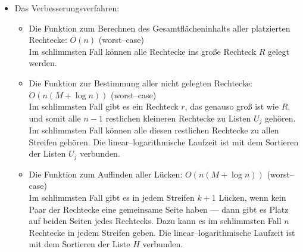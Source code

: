 \begin{itemize}
\begin{itemize}
		\item Das Finden der genauen Stelle in den Listen $S_j$: $O(M \log n)$ (worst--case)\\
		Nicht in jedem Streifen müssen sich dieselben Rechtecke befinden und ein Rechteck 
		kann zu mehreren Steifen gehören.
		In jedem Streifen muss man die genaue Position zum Platzieren des Rechtecks finden.
		Das erfolgt mittels der eingebauten Funktion , die in $O(\log n)$ läuft.\footnote{\href{https://en.cppreference.com/w/cpp/algorithm/upper_bound}{https://en.cppreference.com/w/cpp/algorithm/upper\_bound}}.
		Die Einfügen--Operation in eine  erfolgt in $O(1)$.\footnote{\href{https://en.cppreference.com/w/cpp/container/list/insert}{https://en.cppreference.com/w/cpp/container/list/insert}}
		Im schlimmsten Fall gehört ein Rechteck zu allen Streifen, deshalb muss die endliche Laufzeit
		mal $M$ multipliziert werden.
	\end{itemize}

	\item Das Verbesserungsverfahren: 

	\begin{itemize}
		\item Die Funktion zum Berechnen des Gesamtflächeninhalts aller platzierten Rechtecke: $O(n)$ (worst--case)\\
		Im schlimmsten Fall können alle Rechtecke ins große Rechteck $R$ gelegt werden.

		\item Die Funktion zur Bestimmung aller nicht gelegten Rechtecke: $O(n(M + \log n))$ (worst--case)\\
		Im schlimmsten Fall gibt es ein Rechteck $r$, das genauso groß ist wie $R$, und somit
		alle $n-1$ restlichen kleineren Rechtecke zu Listen $U_j$ gehören. 
		Im schlimmsten Fall können alle diesen restlichen Rechtecke zu allen Streifen gehören.
		Die linear--logarithmische Laufzeit ist mit dem Sortieren der Listen $U_j$ verbunden.

		\item Die Funktion zum Auffinden aller Lücken: $O(n(M + \log n))$ (worst--case)\\
		Im schlimmsten Fall gibt es in jedem Streifen $k+1$ Lücken, wenn kein Paar
		der Rechtecke eine gemeinsame Seite haben --- dann gibt es Platz auf beiden Seiten
		jedes Rechtecks. Dazu kann es im schlimmsten Fall $n$ Rechtecke in jedem Streifen geben.
		Die linear--logarithmische Laufzeit ist mit dem Sortieren der Liste $H$ verbunden.

	\end{itemize}

\end{itemize}